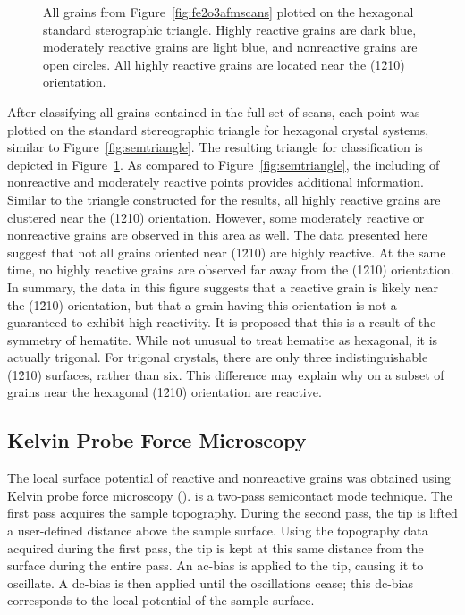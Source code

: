 \documentclass[12pt,%
              twoside,
               letterpaper]{uiothesis}
\begin{document}
\begin{figure}
		\caption[Reactive grains from Figure~\ref{fig:fe2o3afmmap}]{%
			All grains from Figure~\ref{fig:fe2o3afmscans} plotted on the 
			hexagonal standard sterographic triangle. Highly reactive grains 
			are dark blue, moderately reactive grains are light blue, and 
			nonreactive grains are open circles. All highly reactive grains 
			are located near the (1\={2}10) orientation.}
	\label{fig:afmtriangle}	
\end{figure}
After classifying all grains contained in the full set of  scans, each point was
plotted on the standard stereographic triangle for hexagonal crystal systems, similar to
Figure~\ref{fig:semtriangle}. The resulting triangle for  classification is depicted
in Figure~\ref{fig:afmtriangle}. As compared to Figure~\ref{fig:semtriangle}, the including of
nonreactive and moderately reactive points provides additional information. Similar to the
triangle constructed for the  results, all highly reactive grains are clustered
near the (1\={2}10) orientation. However, some moderately reactive or nonreactive grains
are observed in this area as well. The data presented here suggest that not all grains
oriented near (1\={2}10) are highly reactive. At the same time, no highly reactive grains
are observed far away from the (1\={2}10) orientation. In summary, the data in this figure
suggests that a reactive grain is likely near the (1\={2}10) orientation, but that a grain
having this orientation is not a guaranteed to exhibit high reactivity. It is proposed
that this is a result of the symmetry of hematite. While not unusual to treat hematite as
hexagonal, it is actually trigonal. For trigonal crystals, there are only three
indistinguishable (1\={2}10) surfaces, rather than six. This difference may explain why on
a subset of grains near the hexagonal (1\={2}10) orientation are reactive.


\subsection{Kelvin Probe Force Microscopy}
\label{subsec:ch9kfm}


The local surface potential of reactive and nonreactive grains was obtained using Kelvin
probe force microscopy ().  is a two-pass semicontact mode technique.
The first pass acquires the sample topography. During the second pass, the tip is lifted a
user-defined distance above the sample surface. Using the topography data acquired during
the first pass, the tip is kept at this same distance from the surface during the entire
pass. An ac-bias is applied to the tip, causing it to oscillate. A dc-bias is then applied
until the oscillations cease; this dc-bias corresponds to the local potential of the
sample surface.
\end{document}
